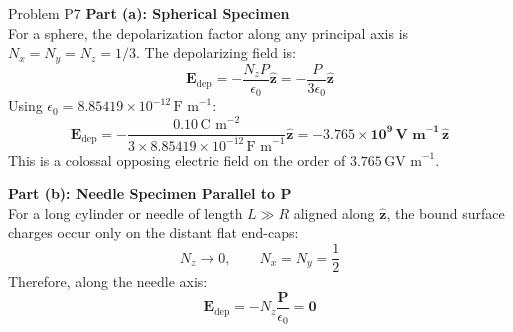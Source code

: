 \documentclass[11pt,a4paper]{article}
\begin{document}
\begin{solbox}{Problem P7}
\textbf{Part (a): Spherical Specimen} \\
For a sphere, the depolarization factor along any principal axis is $N_x = N_y = N_z = 1/3$.
The depolarizing field is:
\begin{equation}
    \mathbf{E}_{\text{dep}} = -\frac{N_z P}{\epsilon_0}\hat{\mathbf{z}} = -\frac{P}{3\epsilon_0}\hat{\mathbf{z}}
\end{equation}
Using $\epsilon_0 = 8.85419 \times 10^{-12}\,\text{F m}^{-1}$:
\begin{equation}
    \mathbf{E}_{\text{dep}} = -\frac{0.10\,\text{C m}^{-2}}{3 \times 8.85419 \times 10^{-12}\,\text{F m}^{-1}}\hat{\mathbf{z}} = \mathbf{-3.765 \times 10^9\,\text{V m}^{-1}\,\hat{\mathbf{z}}}
\end{equation}
This is a colossal opposing electric field on the order of $3.765\,\text{GV m}^{-1}$.

\textbf{Part (b): Needle Specimen Parallel to $\mathbf{P}$} \\
For a long cylinder or needle of length $L \gg R$ aligned along $\hat{\mathbf{z}}$, the bound surface charges occur only on the distant flat end-caps:
\begin{equation}
    N_z \to 0, \qquad N_x = N_y = \frac{1}{2}
\end{equation}
Therefore, along the needle axis:
\begin{equation}
    \mathbf{E}_{\text{dep}} = -N_z \frac{\mathbf{P}}{\epsilon_0} = \mathbf{0}
\end{equation}


\end{solbox}
\end{document}
